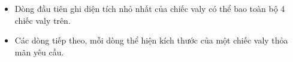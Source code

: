 \begin{itemize}
	\item Dòng đầu tiên ghi diện tích nhỏ nhất của chiếc valy có thể bao toàn bộ 4 chiếc valy trên.
	\item Các dòng tiếp theo, mỗi dòng thể hiện kích thước của một chiếc valy thỏa mãn yêu cầu.
\end{itemize}

\